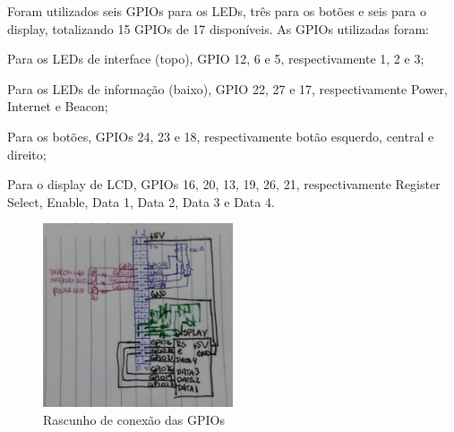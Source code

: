 \documentclass[
		12pt,				%
		openright,			%
		oneside,			%
		a4paper,			%
		chapter=TITLE,		%
		english,			%
		brazil				%
	]{abntex2}
\begin{document}
Foram utilizados seis GPIOs para os LEDs, três para os botões e seis para o display, totalizando 15 GPIOs de 17 disponíveis. As GPIOs utilizadas foram:

\begin{alineas}
	\item Para os LEDs de interface (topo), GPIO 12, 6 e 5, respectivamente 1, 2 e 3;
	\item Para os LEDs de informação (baixo), GPIO 22, 27 e 17, respectivamente Power, Internet e Beacon;
	\item Para os botões, GPIOs 24, 23 e 18, respectivamente botão esquerdo, central e direito;
	\item Para o display de LCD, GPIOs 16, 20, 13, 19, 26, 21, respectivamente Register Select, Enable, Data 1, Data 2, Data 3 e Data 4.
\end{alineas}

\begin{figure}[htb]
	\caption{\label{fig:pinout-gpio}Rascunho de conexão das GPIOs}
	\begin{center}
		\includegraphics[width=0.5\textwidth]{img/pinout-gpio.jpg}
	\end{center}
\end{figure}
\end{document}
